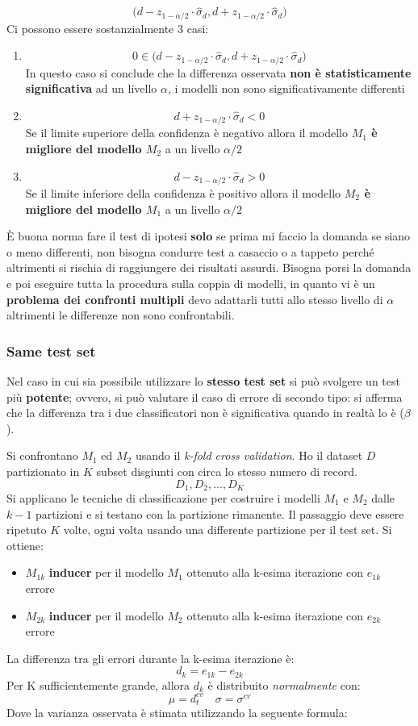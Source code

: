 \[ \bigl( d - z_{1-\alpha/2} \cdot \hat{\sigma}_d, d + z_{1-\alpha/2} \cdot \hat{\sigma}_d \bigr) \]
Ci possono essere sostanzialmente 3 casi:
\begin{enumerate}
	\item \[0 \in \bigl( d - z_{1-\alpha/2} \cdot \hat{\sigma}_d, d + z_{1-\alpha/2} \cdot \hat{\sigma}_d \bigr)\] 
	In questo caso si conclude che la differenza osservata \textbf{non è statisticamente significativa} ad un livello $\alpha$, i modelli non sono significativamente differenti 
	\item \[d + z_{1-\alpha/2} \cdot \hat{\sigma}_d < 0\] 
	Se il limite superiore della confidenza è negativo allora il modello \textbf{$M_1$ è migliore del modello $M_2$} a un livello $\alpha/2$
	\item \[d - z_{1-\alpha/2} \cdot \hat{\sigma}_d > 0\] 
	Se il limite inferiore della confidenza è positivo allora il modello \textbf{$M_2$ è migliore del modello $M_1$} a un livello $\alpha/2$
\end{enumerate}

\`E buona norma fare il test di ipotesi \textbf{solo} se prima mi faccio la domanda se siano o meno differenti, non bisogna  condurre test a casaccio o a tappeto perché altrimenti si rischia di raggiungere dei risultati assurdi. Bisogna porsi la domanda e poi eseguire tutta la procedura sulla coppia di modelli, in quanto vi è un \textbf{problema dei confronti multipli} devo adattarli tutti allo stesso livello di $\alpha$ altrimenti le differenze non sono confrontabili.

\subsubsection{Same test set}
Nel caso in cui sia possibile utilizzare lo \textbf{stesso test set} si può svolgere un test più \textbf{potente}; ovvero, si può valutare il caso di errore di secondo tipo: si afferma che la differenza tra i due classificatori non è significativa quando in realtà lo è ($\beta$). 

Si confrontano $M_1$ ed $M_2$ usando il \textit{k-fold cross validation}.
Ho il dataset $D$ partizionato in $K$ subset disgiunti con circa lo stesso numero di record. 
\[D_1, D_2, ..., D_K\]
Si applicano le tecniche di classificazione per costruire i modelli $M_1$ e $M_2$ dalle $k-1$ partizioni e si testano con la partizione rimanente. Il passaggio deve essere ripetuto $K$ volte, ogni volta usando una differente partizione per il test set. Si ottiene:
\begin{itemize}
	\item $M_{1k}$ \textbf{inducer} per il modello $M_1$ ottenuto alla k-esima iterazione con $e_{1k}$ errore
	\item $M_{2k}$ \textbf{inducer} per il modello $M_2$ ottenuto alla k-esima iterazione con $e_{2k}$ errore
\end{itemize}
La differenza tra gli errori durante la k-esima iterazione è:
\[d_k = e_{1k} - e_{2k}\]
Per K sufficientemente grande, allora $d_k$ è distribuito \textit{normalmente} con: 
\[\mu = d_t^{cv} \quad \sigma = \sigma^{cv}\]
Dove la varianza osservata è stimata utilizzando la seguente formula: 

